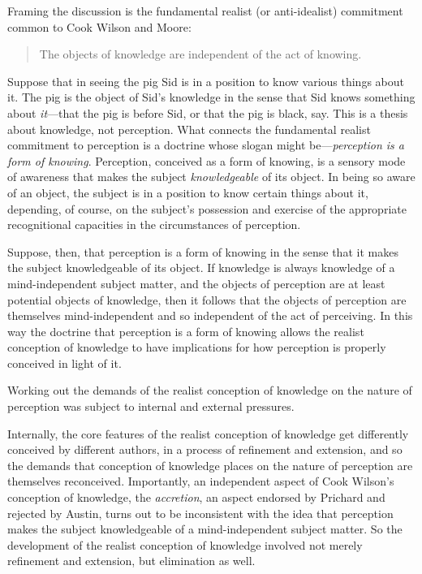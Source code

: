\documentclass[11pt]{article}
\begin{document}
Framing the discussion is the fundamental realist (or anti-idealist) commitment common to Cook Wilson and Moore:
\begin{quote}
	The objects of knowledge are independent of the act of knowing.
\end{quote}
Suppose that in seeing the pig Sid is in a position to know various things about it. The pig is the object of Sid's knowledge in the sense that Sid knows something about \emph{it}---that the pig is before Sid, or that the pig is black, say. This is a thesis about knowledge, not perception. What connects the fundamental realist commitment to perception is a doctrine whose slogan might be---\emph{perception is a form of knowing}. Perception, conceived as a form of knowing, is a sensory mode of awareness that makes the subject \emph{knowledgeable} of its object. In being so aware of an object, the subject is in a position to know certain things about it, depending, of course, on the subject's possession and exercise of the appropriate recognitional capacities in the circumstances of perception.

Suppose, then, that perception is a form of knowing in the sense that it makes the subject knowledgeable of its object. If knowledge is always knowledge of a mind-independent subject matter, and the objects of perception are at least potential objects of knowledge, then it follows that the objects of perception are themselves mind-independent and so independent of the act of perceiving. In this way the doctrine that perception is a form of knowing allows the realist conception of knowledge to have implications for how perception is properly conceived in light of it.

Working out the demands of the realist conception of knowledge on the nature of perception was subject to internal and external pressures. 

Internally, the core features of the realist conception of knowledge get differently conceived by different authors, in a process of refinement and extension, and so the demands that conception of knowledge places on the nature of perception are themselves reconceived. Importantly, an independent aspect of Cook Wilson's conception of knowledge, the \emph{accretion}, an aspect endorsed by Prichard and rejected by Austin, turns out to be inconsistent with the idea that perception makes the subject knowledgeable of a mind-independent subject matter. So the development of the realist conception of knowledge involved not merely refinement and extension, but elimination as well.
\end{document}
